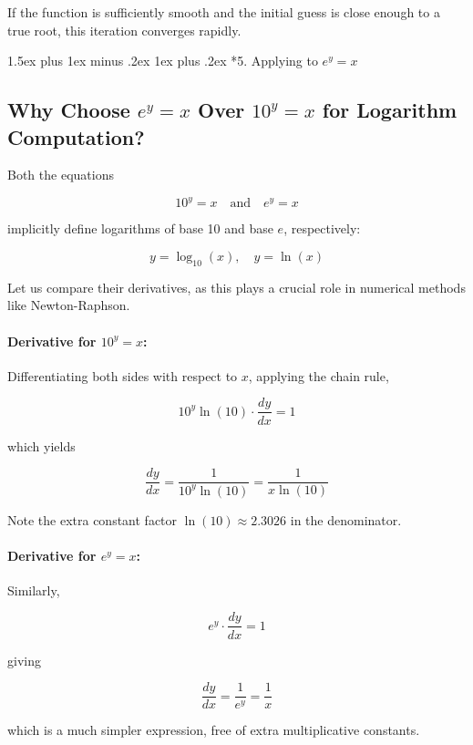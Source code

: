 \documentclass[10pt,twocolumn]{article}
\makeatletter
\renewcommand\section{%
  \@startsection{section}{1}{0pt}%
  {1.5ex plus 1ex minus .2ex}%
  {1ex plus .2ex}%
  {\normalfont\normalsize\bfseries}} %
\makeatother
\begin{document}
If the function is sufficiently smooth and the initial guess is close enough to a true root, this iteration converges rapidly.

\section*{5. Applying to \( e^y = x \)}

\subsection*{Why Choose \( e^y = x \) Over \( 10^y = x \) for Logarithm Computation?}

Both the equations

\[
10^y = x \quad \text{and} \quad e^y = x
\]

implicitly define logarithms of base 10 and base \( e \), respectively:

\[
y = \log_{10}(x), \quad y = \ln(x)
\]

Let us compare their derivatives, as this plays a crucial role in numerical methods like Newton-Raphson.

\paragraph{Derivative for \( 10^y = x \):}

Differentiating both sides with respect to \( x \), applying the chain rule,

\[
10^y \ln(10) \cdot \frac{dy}{dx} = 1
\]

which yields

\[
\frac{dy}{dx} = \frac{1}{10^y \ln(10)} = \frac{1}{x \ln(10)}
\]

Note the extra constant factor \( \ln(10) \approx 2.3026 \) in the denominator.

\paragraph{Derivative for \( e^y = x \):}

Similarly,

\[
e^y \cdot \frac{dy}{dx} = 1
\]

giving

\begin{equation}
\frac{dy}{dx} = \frac{1}{e^y} = \frac{1}{x}
\end{equation}

which is a much simpler expression, free of extra multiplicative constants.
\end{document}
